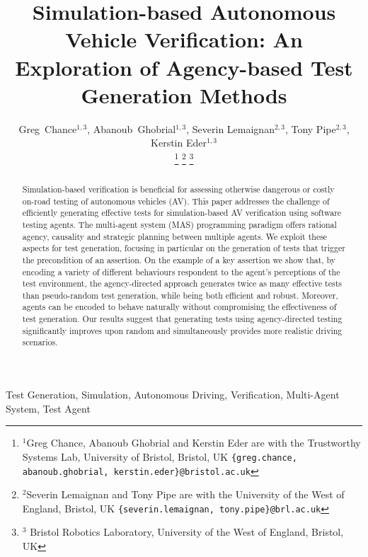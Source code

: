 \documentclass[letterpaper, 10 pt, journal, twoside]{IEEEtran}
\begin{document}
\title{Simulation-based Autonomous Vehicle Verification: An Exploration of Agency-based Test Generation Methods}
\author{Greg~Chance$^{1,3}$, 
Abanoub~Ghobrial$^{1,3}$, 
Severin Lemaignan$^{2,3}$,
Tony Pipe$^{2,3}$,
Kerstin Eder$^{1,3}$%


\thanks{$^{1}$Greg Chance, Abanoub Ghobrial and Kerstin Eder are with the Trustworthy Systems Lab, University of Bristol, Bristol, UK {\tt\footnotesize \{greg.chance, abanoub.ghobrial, kerstin.eder\}@bristol.ac.uk}}%
\thanks{$^{2}$Severin Lemaignan and Tony Pipe are with the University of the West of England, Bristol, UK {\tt\footnotesize \{severin.lemaignan, tony.pipe\}@brl.ac.uk}}
\thanks{$^{3}$ Bristol Robotics Laboratory, University of the West of England, Bristol, UK}%
}
\maketitle

\begin{abstract}
Simulation-based verification is beneficial for assessing otherwise dangerous or costly on-road testing of autonomous vehicles (AV). This paper addresses the challenge of efficiently generating effective tests for simulation-based AV verification using software testing agents. The multi-agent system (MAS) programming paradigm offers rational agency, causality and strategic planning between multiple agents. We exploit these aspects for test generation, focusing in particular on the generation of tests that trigger the precondition of an assertion. On the example of a key assertion we show that, by encoding a variety of different behaviours respondent to the agent's perceptions of the test environment, the agency-directed approach generates twice as many effective tests than pseudo-random test generation, while being both efficient and robust. Moreover, agents can be encoded to behave naturally without compromising the effectiveness of test generation. Our results suggest that generating tests using agency-directed testing significantly improves upon random and simultaneously provides more realistic driving scenarios.

\end{abstract}
\begin{IEEEkeywords}
Test Generation, Simulation, Autonomous Driving, Verification, Multi-Agent System, Test Agent
\end{IEEEkeywords}
\IEEEpeerreviewmaketitle

\end{document}
